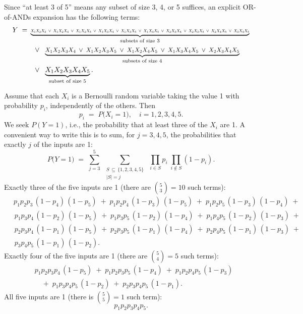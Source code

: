 Since ``at least 3 of 5'' means any subset of size 3, 4, or 5 suffices, an explicit OR-of-ANDs expansion has the following terms:
\begin{equation}
\begin{aligned}
Y \;=\;&
\underbrace{
  \resizebox{.90\hsize}{!}{$
    X_1 X_2 X_3 \;\lor\; X_1 X_2 X_4 \;\lor\; X_1 X_2 X_5 \;\lor\; X_1 X_3 X_4 \;\lor\; X_1 X_3 X_5 \;\lor\; X_1 X_4 X_5 \;\lor\; X_2 X_3 X_4 \;\lor\; X_2 X_3 X_5 \;\lor\; X_2 X_4 X_5 \;\lor\; X_3 X_4 X_5
  $}
}_{\text{subsets of size 3}}
\\
&\;\;\lor\;\;
\underbrace{
  \resizebox{.80\hsize}{!}{$
    X_1 X_2 X_3 X_4 \;\lor\; X_1 X_2 X_3 X_5 \;\lor\; X_1 X_2 X_4 X_5 \;\lor\; X_1 X_3 X_4 X_5 \;\lor\; X_2 X_3 X_4 X_5
  $}
}_{\text{subsets of size 4}}
\\
&\;\;\lor\;\;
\underbrace{X_1 X_2 X_3 X_4 X_5}_{\text{subset of size 5}}.
\end{aligned}
\end{equation}

Assume that each \(X_i\) is a Bernoulli random variable taking the value 1 with probability \(p_i\), independently of the others. Then
\[
p_i 
\;=\;
P\bigl(X_i = 1\bigr),
\quad
i = 1,2,3,4,5.
\]
We seek 
\(\displaystyle P(Y=1)\), i.e., the probability that at least three of the \(X_i\) are 1.  A convenient way to write this is to sum, for \(j=3,4,5\), the probabilities that exactly \(j\) of the inputs are 1:
\[
P\bigl(Y=1\bigr)
\;=\;
\sum_{j=3}^{5}
\;\sum_{\substack{S\,\subseteq\,\{1,2,3,4,5\}\\|S|=j}}
\;\prod_{i\in S} p_i\;
\prod_{i\notin S} (1 - p_i).
\]
Exactly three of the five inputs are 1 (there are \(\binom{5}{3} = 10\) such terms):
\[
\begin{aligned}
&\,p_1 p_2 p_3\,(1\!-\!p_4)\,(1\!-\!p_5)\;+\;
p_1 p_2 p_4\,(1\!-\!p_3)\,(1\!-\!p_5)\;+\;
p_1 p_2 p_5\,(1\!-\!p_3)\,(1\!-\!p_4)\;+\;
\\
&\;p_1 p_3 p_4\,(1\!-\!p_2)\,(1\!-\!p_5)\;+\;
p_1 p_3 p_5\,(1\!-\!p_2)\,(1\!-\!p_4)\;+\;
p_1 p_4 p_5\,(1\!-\!p_2)\,(1\!-\!p_3)\;+\;
\\
&\;p_2 p_3 p_4\,(1\!-\!p_1)\,(1\!-\!p_5)\;+\;
p_2 p_3 p_5\,(1\!-\!p_1)\,(1\!-\!p_4)\;+\;
p_2 p_4 p_5\,(1\!-\!p_1)\,(1\!-\!p_3)\;+\;
\\
&\;p_3 p_4 p_5\,(1\!-\!p_1)\,(1\!-\!p_2).
\end{aligned}
\]
Exactly four of the five inputs are 1 (there are \(\binom{5}{4}=5\) such terms):
\[
\begin{aligned}
&p_1 p_2 p_3 p_4\,(1\!-\!p_5)
\;+\;
p_1 p_2 p_3 p_5\,(1\!-\!p_4)
\;+\;
p_1 p_2 p_4 p_5\,(1\!-\!p_3)
\\
&\quad+\;
p_1 p_3 p_4 p_5\,(1\!-\!p_2)
\;+\;
p_2 p_3 p_4 p_5\,(1\!-\!p_1).
\end{aligned}
\]
All five inputs are 1 (there is \(\binom{5}{5}=1\) such term):
\[
p_1 p_2 p_3 p_4 p_5.
\]


